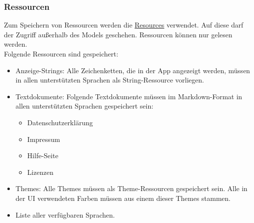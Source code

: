 \subsubsection{Ressourcen}
Zum Speichern von Ressourcen werden die \href{https://developer.android.com/reference/android/content/res/Resources}
{Resources} verwendet. Auf diese darf der Zugriff außerhalb des Models geschehen. Ressourcen können nur gelesen werden.\\
Folgende Ressourcen sind gespeichert:
\begin{itemize}
    \item Anzeige-Strings: Alle Zeichenketten, die in der App angezeigt werden, 
    müssen in allen unterstützten Sprachen als String-Ressource vorliegen.
    \item Textdokumente: Folgende Textdokumente müssen im Markdown-Format in allen unterstützten 
    Sprachen gespeichert sein:
    \begin{itemize}
        \item Datenschutzerklärung
        \item Impressum
        \item Hilfe-Seite
        \item Lizenzen
    \end{itemize}
    \item Themes: Alle Themes müssen als Theme-Ressourcen gespeichert sein. 
    Alle in der UI verwendeten Farben müssen aus einem dieser Themes stammen.
    \item Liste aller verfügbaren Sprachen.
\end{itemize}